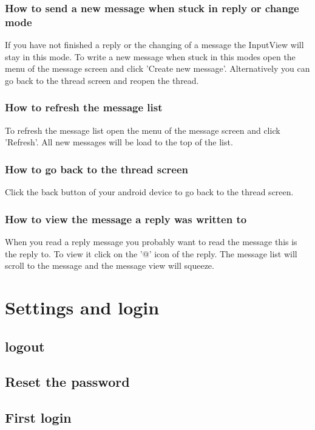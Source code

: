 \documentclass[12pt,a4paper,oneside]{report}
\begin{document}
\subsubsection{How to send a new message when stuck in reply or change mode}
If you have not finished a reply or the changing of a message the InputView will stay in this mode. To write a new message when stuck in this modes open the menu of the message screen and click 'Create new message'. Alternatively you can go back to the thread screen and reopen the thread.

\subsubsection{How to refresh the message list}
To refresh the message list open the menu of the message screen and click 'Refresh'. All new messages will be load to the top of the list.

\subsubsection{How to go back to the thread screen}
Click the back button of your android device to go back to the thread screen.

\subsubsection{How to view the message a reply was written to}
When you read a reply message you probably want to read the message this is the reply to. To view it click on the '@' icon of the reply. The message list will scroll to the message and the message view will squeeze. 

\section{Settings and login}

\subsection{logout}

\subsection{Reset the password}

\subsection{First login}
\end{document}
